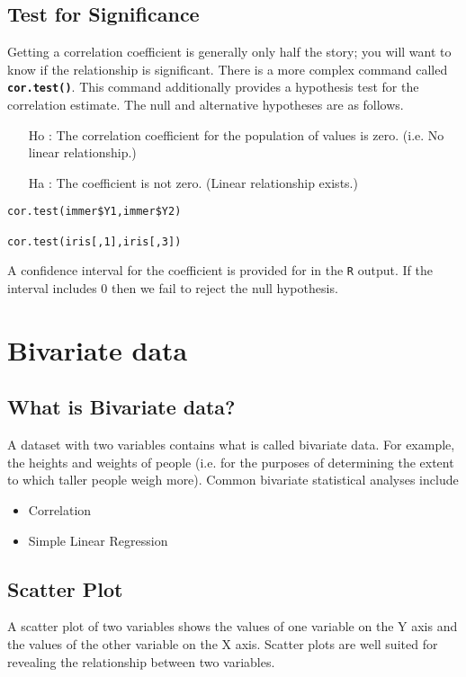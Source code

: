 \subsection*{Test for Significance}
Getting a correlation coefficient is generally only half the story; you will want to know if the relationship is significant. There is a more complex command called \texttt{\textbf{cor.test()}}. This command additionally provides a hypothesis test for the correlation estimate. The null and alternative hypotheses are as follows.

\begin{itemize}
	\item[Ho] : The correlation coefficient for the population of values is zero. (i.e. No linear relationship.)
	\item[Ha] : The coefficient is not zero. (Linear relationship exists.)
\end{itemize}

\begin{framed}
\begin{verbatim}
cor.test(immer$Y1,immer$Y2)

cor.test(iris[,1],iris[,3])
\end{verbatim}
\end{framed}

	


A confidence interval for the coefficient is provided for in the \texttt{R} output. If the interval includes 0 then we fail to reject the null hypothesis.
\newpage
\section{Bivariate data}
\subsection{What is Bivariate data?}

A dataset with two variables contains what is called bivariate data. For example, the heights and weights of people (i.e. for the purposes of determining the extent to which taller people weigh more). Common bivariate statistical analyses include
\begin{itemize}
\item Correlation
\item Simple Linear Regression
\end{itemize}

\subsection{Scatter Plot} A scatter plot of two variables shows the values of one variable on the Y axis and the values of the other variable on the X axis. Scatter plots are well suited for revealing the relationship between two variables.

